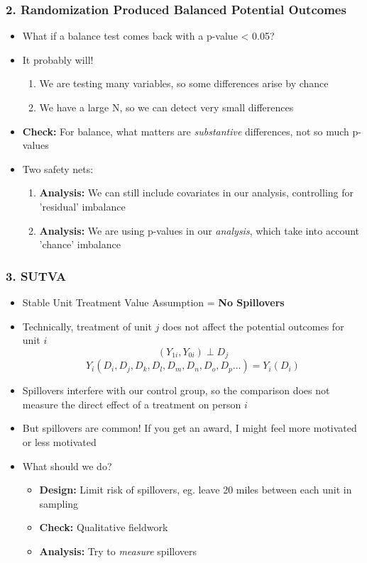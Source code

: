 \documentclass[xcolor=x11names,compress]{beamer}\usepackage[]{graphicx}\usepackage[]{color}
\renewcommand{\(}{\begin{columns}}
\renewcommand{\)}{\end{columns}}
\newcommand{\<}[1]{\begin{column}{#1}}
\renewcommand{\>}{\end{column}}
\begin{document}
\begin{frame}
\frametitle{2. Randomization Produced Balanced Potential Outcomes}
\begin{itemize}
\item What if a balance test comes back with a p-value < 0.05?
\pause
\item It probably will!
\begin{enumerate}
\item We are testing many variables, so some differences arise by chance
\pause
\item We have a large N, so we can detect very small differences
\pause
\end{enumerate}
\item \textbf{Check:} For balance, what matters are \textit{substantive} differences, not so much p-values
\pause
\item Two safety nets:
\begin{enumerate}
\item \textbf{Analysis:} We can still include covariates in our analysis, controlling for 'residual' imbalance
\pause
\item \textbf{Analysis:} We are using p-values in our \textit{analysis}, which take into account 'chance' imbalance
\pause
\end{enumerate}
\end{itemize}
\end{frame}

\begin{frame}
\frametitle{3. SUTVA}
\begin{itemize}
\item Stable Unit Treatment Value Assumption = \textbf{No Spillovers}
\pause
\item Technically, treatment of unit $j$ does not affect the potential outcomes for unit $i$
\pause
$$(Y_{1i}, Y_{0i}) \perp D_j$$
\pause
$$Y_i(D_i, D_j, D_k, D_l, D_m, D_n, D_o, D_p...) = Y_i(D_i)$$
\pause
\item Spillovers interfere with our control group, so the comparison does not measure the direct effect of a treatment on person $i$ 
\pause
\item But spillovers are common! If you get an award, I might feel more motivated or less motivated
\pause
\item What should we do?
\pause
\begin{itemize}
\item \textbf{Design:} Limit risk of spillovers, eg. leave 20 miles between each unit in sampling
\item \textbf{Check:} Qualitative fieldwork
\item \textbf{Analysis:} Try to \textit{measure} spillovers
\end{itemize}
\end{itemize}
\end{frame}
\end{document}
